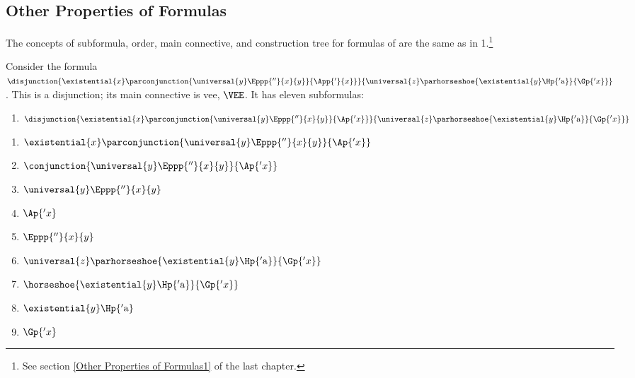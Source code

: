 \subsection{Other Properties of Formulas}\label{Other Properties of Formulas} 
The concepts of subformula, order, main connective, and construction tree for formulas of \GQL{} are the same as in \GQL{}1.\footnote{See section \ref{Other Properties of Formulas1} of the last chapter.} 
\begin{majorILnc}{}
Consider the formula $\disjunction{\existential{\variable{x}}\parconjunction{\universal{y}\Eppp{''}{\variable{x}}{\variable{y}}}{\App{'}{\variable{x}}}}{\universal{\variable{z}}\parhorseshoe{\existential{\variable{y}}\Hp{'\constant{a}}}{\Gp{'\variable{x}}}}$.
This is a disjunction; its main connective is vee, $\VEE$.
It has eleven subformulas:
\begin{enumerate}[label=(\arabic*), leftmargin=1.85\parindent,
labelindent=.35\parindent, labelsep=*, itemsep=0pt]%
\item $\disjunction{\existential{\variable{x}}\parconjunction{\universal{y}\Eppp{''}{\variable{x}}{\variable{y}}}{\Ap{'\variable{x}}}}{\universal{\variable{z}}\parhorseshoe{\existential{\variable{y}}\Hp{'\constant{a}}}{\Gp{'\variable{x}}}}$
\end{enumerate}
\vspace*{-.5cm}
\begin{multicols}{2}
\begin{enumerate}[label=(\arabic*), leftmargin=1.85\parindent,
labelindent=.35\parindent, labelsep=*, itemsep=0pt, start=2]%
\item $\existential{\variable{x}}\parconjunction{\universal{y}\Eppp{''}{\variable{x}}{\variable{y}}}{\Ap{'\variable{x}}}$
\item $\conjunction{\universal{y}\Eppp{''}{\variable{x}}{\variable{y}}}{\Ap{'\variable{x}}}$
\item $\universal{y}\Eppp{''}{\variable{x}}{\variable{y}}$
\item $\Ap{'\variable{x}}$
\item $\Eppp{''}{\variable{x}}{\variable{y}}$
\item $\universal{\variable{z}}\parhorseshoe{\existential{\variable{y}}\Hp{'\constant{a}}}{\Gp{'\variable{x}}}$
\item $\horseshoe{\existential{\variable{y}}\Hp{'\constant{a}}}{\Gp{'\variable{x}}}$
\item $\existential{\variable{y}}\Hp{'\constant{a}}$
\item $\Gp{'\variable{x}}$

\end{enumerate}
\end{multicols}
\end{majorILnc}
